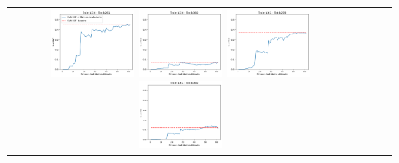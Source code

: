 \begin{figure}[h!]
\begin{tabular}{cccc}
  \includegraphics[width=0.25\textwidth]{Kap6/pearson_rbf_INDIVIDUAL_CURVES_train=b234test=b261}  \includegraphics[width=0.25\textwidth]{Kap6/pearson_rbf_INDIVIDUAL_CURVES_train=b234test=b360}
  \includegraphics[width=0.25\textwidth]{Kap6/pearson_rbf_INDIVIDUAL_CURVES_train=b261test=b278}  \includegraphics[width=0.25\textwidth]{Kap6/pearson_rbf_INDIVIDUAL_CURVES_train=b261test=b360} \\


\end{tabular}
\end{figure}
